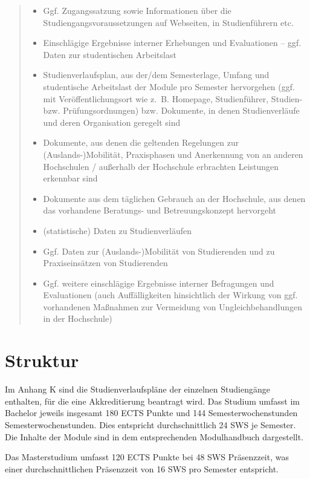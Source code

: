 \begin{quote}
\begin{itemize}
\item
  Ggf. Zugangssatzung sowie Informationen über die
  Studiengangsvoraussetzungen auf Webseiten, in Studienführern etc.
\item
  Einschlägige Ergebnisse interner Erhebungen und Evaluationen -- ggf.
  Daten zur studentischen Arbeitslast
\item
  Studienverlaufsplan, aus der/dem Semesterlage, Umfang und studentische
  Arbeitslast der Module pro Semester hervorgehen (ggf. mit
  Veröffentlichungsort wie z.~B. Homepage, Studienführer, Studien- bzw.
  Prüfungsordnungen) bzw. Dokumente, in denen Studienverläufe und deren
  Organisation geregelt sind
\item
  Dokumente, aus denen die geltenden Regelungen zur
  (Auslands-)Mobilität, Praxisphasen und Anerkennung von an anderen
  Hochschulen / außerhalb der Hochschule erbrachten Leistungen erkennbar
  sind
\item
  Dokumente aus dem täglichen Gebrauch an der Hochschule, aus denen das
  vorhandene Beratungs- und Betreuungskonzept hervorgeht
\item
  (statistische) Daten zu Studienverläufen
\item
  Ggf. Daten zur (Auslands-)Mobilität von Studierenden und zu
  Praxiseinsätzen von Studierenden
\item
  Ggf. weitere einschlägige Ergebnisse interner Befragungen und
  Evaluationen (auch Auffälligkeiten hinsichtlich der Wirkung von ggf.
  vorhandenen Maßnahmen zur Vermeidung von Ungleichbehandlungen in der
  Hochschule)
\end{itemize}
\end{quote}

\section{Struktur}\label{struktur}

Im Anhang K sind die Studienverlaufspläne der einzelnen Studiengänge
enthalten, für die eine Akkreditierung beantragt wird. Das Studium
umfasst im Bachelor jeweils insgesamt 180 ECTS Punkte und 144
Semesterwochenstunden Semesterwochenstunden. Dies entspricht
durchschnittlich 24 SWS je Semester. Die Inhalte der Module sind in dem
entsprechenden Modulhandbuch dargestellt.

Das Masterstudium umfasst 120 ECTS Punkte bei 48 SWS Präsenzzeit, was
einer durchschnittlichen Präsenzzeit von 16 SWS pro Semester entspricht.

